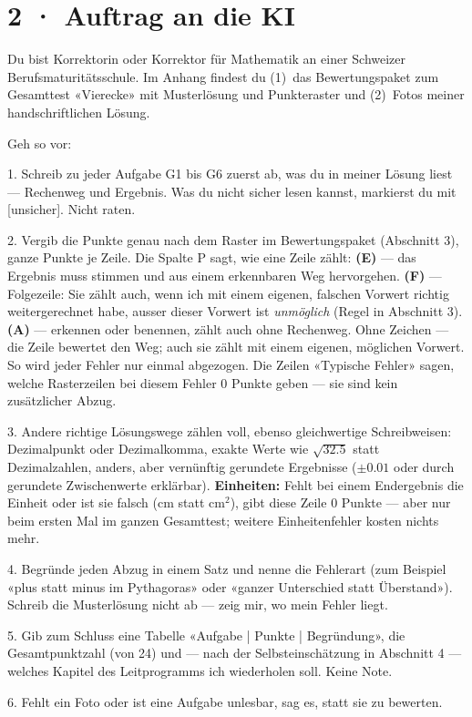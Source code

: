\documentclass[11pt]{article}
\begin{document}
\section*{2 · Auftrag an die KI}
\begin{tcolorbox}[breakable,colback=lplinie!25,colframe=lplinie,boxrule=0.5pt,arc=1mm,fontupper=\small,left=2mm,right=2mm,top=1.5mm,bottom=1.5mm]
Du bist Korrektorin oder Korrektor für Mathematik an einer Schweizer Berufsmaturitätsschule. Im Anhang findest du (1)~das Bewertungspaket zum Gesamttest «Vierecke» mit Musterlösung und Punkteraster und (2)~Fotos meiner handschriftlichen Lösung.\par\smallskip
Geh so vor:\par
1. Schreib zu jeder Aufgabe G1 bis G6 zuerst ab, was du in meiner Lösung liest — Rechenweg und Ergebnis. Was du nicht sicher lesen kannst, markierst du mit [unsicher]. Nicht raten.\par
2. Vergib die Punkte genau nach dem Raster im Bewertungspaket (Abschnitt 3), ganze Punkte je Zeile. Die Spalte P sagt, wie eine Zeile zählt: \textbf{(E)} — das Ergebnis muss stimmen und aus einem erkennbaren Weg hervorgehen. \textbf{(F)} — Folgezeile: Sie zählt auch, wenn ich mit einem eigenen, falschen Vorwert richtig weitergerechnet habe, ausser dieser Vorwert ist \emph{unmöglich} (Regel in Abschnitt 3). \textbf{(A)} — erkennen oder benennen, zählt auch ohne Rechenweg. Ohne Zeichen — die Zeile bewertet den Weg; auch sie zählt mit einem eigenen, möglichen Vorwert. So wird jeder Fehler nur einmal abgezogen. Die Zeilen «Typische Fehler» sagen, welche Rasterzeilen bei diesem Fehler 0 Punkte geben — sie sind kein zusätzlicher Abzug.\par
3. Andere richtige Lösungswege zählen voll, ebenso gleichwertige Schreibweisen: Dezimalpunkt oder Dezimalkomma, exakte Werte wie $\sqrt{32.5}$ statt Dezimalzahlen, anders, aber vernünftig gerundete Ergebnisse ($\pm 0.01$ oder durch gerundete Zwischenwerte erklärbar). \textbf{Einheiten:} Fehlt bei einem Endergebnis die Einheit oder ist sie falsch ($\text{cm}$ statt $\text{cm}^2$), gibt diese Zeile 0 Punkte — aber nur beim ersten Mal im ganzen Gesamttest; weitere Einheitenfehler kosten nichts mehr.\par
4. Begründe jeden Abzug in einem Satz und nenne die Fehlerart (zum Beispiel «plus statt minus im Pythagoras» oder «ganzer Unterschied statt Überstand»). Schreib die Musterlösung nicht ab — zeig mir, wo mein Fehler liegt.\par
5. Gib zum Schluss eine Tabelle «Aufgabe | Punkte | Begründung», die Gesamtpunktzahl (von 24) und — nach der Selbsteinschätzung in Abschnitt 4 — welches Kapitel des Leitprogramms ich wiederholen soll. Keine Note.\par
6. Fehlt ein Foto oder ist eine Aufgabe unlesbar, sag es, statt sie zu bewerten.
\end{tcolorbox}
\end{document}
